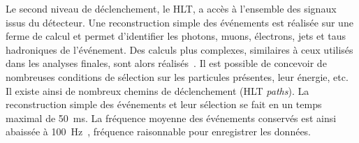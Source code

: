 \par Le second niveau de déclenchement, le HLT, a accès à l'ensemble des signaux issus du détecteur.
Une reconstruction simple des événements est réalisée sur une ferme de calcul et permet d'identifier les photons, muons, électrons, jets et taus hadroniques de l'événement.
Des calculs plus complexes, similaires à ceux utilisés dans les analyses finales, sont alors réalisés~\cite{cms_paper}.
Il est possible de concevoir de nombreuses conditions de sélection sur les particules présentes, leur énergie, etc.
Il existe ainsi de nombreux chemins de déclenchement (HLT \emph{paths}).
La reconstruction simple des événements et leur sélection se fait en un temps maximal de \SI{50}{\milli\second}.
La fréquence moyenne des événements conservés est ainsi abaissée à \SI{100}{\hertz}~\cite{cms_paper,CMS-TRG-12-001}, fréquence raisonnable pour enregistrer les données.
